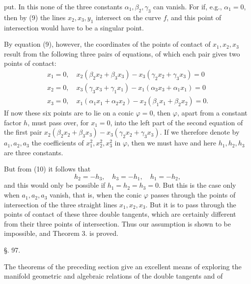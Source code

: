 put. In this none of the three constants $\alpha_1, \beta_2, \gamma_3$ can vanish. For if, e.g., $\alpha_1 = 0$, then by (9) the lines $x_2, x_3, y_1$ intersect on the curve $f$, and this point of intersection would have to be a singular point.

By equation (9), however, the coordinates of the points of contact of $x_1, x_2, x_3$ result from the following three pairs of equations, of which each pair gives two points of contact:
\[
\begin{gathered}
x_1 = 0,\quad x_2(\beta_2 x_2 + \beta_3 x_3) - x_3(\gamma_2 x_2 + \gamma_3 x_3) = 0\\
x_2 = 0,\quad x_3(\gamma_3 x_3 + \gamma_1 x_1) - x_1(\alpha_3 x_3 + \alpha_1 x_1) = 0\\
x_3 = 0,\quad x_1(\alpha_1 x_1 + \alpha_2 x_2) - x_2(\beta_1 x_1 + \beta_2 x_2) = 0.
\end{gathered}
\]
If now these six points are to lie on a conic $\varphi = 0$, then $\varphi$, apart from a constant factor $h$, must pass over, for $x_1 = 0$, into the left part of the second equation of the first pair $x_2(\beta_2 x_2 + \beta_3 x_3) - x_3(\gamma_2 x_2 + \gamma_3 x_3)$. If we therefore denote by $a_1, a_2, a_3$ the coefficients of $x_1^2, x_2^2, x_3^2$ in $\varphi$, then we must have
and here $h_1, h_2, h_3$ are three constants.

But from (10) it follows that
\[
h_2 = -h_3,\quad h_3 = -h_1,\quad h_1 = -h_2,
\]
and this would only be possible if $h_1 = h_2 = h_3 = 0$.
But this is the case only when $a_1, a_2, a_3$ vanish, that is, when the conic $\varphi$ passes through the points of intersection of the three straight lines $x_1, x_2, x_3$. But it is to pass through the points of contact of these three double tangents, which are certainly different from their three points of intersection. Thus our assumption is shown to be impossible, and Theorem 3. is proved.

\begin{center}
§. 97.

\end{center}

The theorems of the preceding section give an excellent means of exploring the manifold geometric and algebraic relations of the double tangents and of
